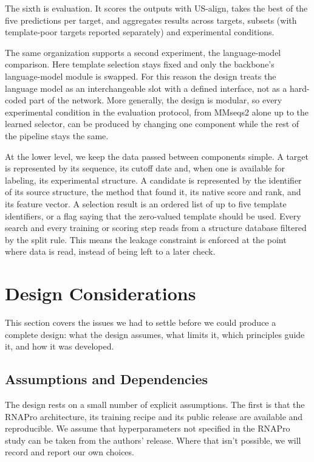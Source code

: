 \documentclass{FastFyp}
\begin{document}
The sixth is evaluation. It scores the outputs with US-align, takes the best of the five predictions per target, and aggregates results across targets, subsets (with template-poor targets reported separately) and experimental conditions.

The same organization supports a second experiment, the language-model comparison. Here template selection stays fixed and only the backbone's language-model module is swapped. For this reason the design treats the language model as an interchangeable slot with a defined interface, not as a hard-coded part of the network. More generally, the design is modular, so every experimental condition in the evaluation protocol, from MMseqs2 alone up to the learned selector, can be produced by changing one component while the rest of the pipeline stays the same.

At the lower level, we keep the data passed between components simple. A target is represented by its sequence, its cutoff date and, when one is available for labeling, its experimental structure. A candidate is represented by the identifier of its source structure, the method that found it, its native score and rank, and its feature vector. A selection result is an ordered list of up to five template identifiers, or a flag saying that the zero-valued template should be used. Every search and every training or scoring step reads from a structure database filtered by the split rule. This means the leakage constraint is enforced at the point where data is read, instead of being left to a later check.

\section{Design Considerations}
This section covers the issues we had to settle before we could produce a complete design: what the design assumes, what limits it, which principles guide it, and how it was developed.

\subsection{Assumptions and Dependencies}
The design rests on a small number of explicit assumptions. The first is that the RNAPro architecture, its training recipe and its public release are available and reproducible. We assume that hyperparameters not specified in the RNAPro study can be taken from the authors' release. Where that isn't possible, we will record and report our own choices.
\end{document}
